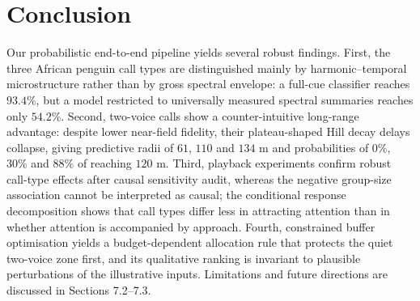 \documentclass{apmcmthesis}
\begin{document}
\section{Conclusion}

Our probabilistic end-to-end pipeline yields several robust findings. First, the three African penguin call types are distinguished mainly by harmonic--temporal microstructure rather than by gross spectral envelope: a full-cue classifier reaches $93.4\%$, but a model restricted to universally measured spectral summaries reaches only $54.2\%$. Second, two-voice calls show a counter-intuitive long-range advantage: despite lower near-field fidelity, their plateau-shaped Hill decay delays collapse, giving predictive radii of $61$, $110$ and $134$ m and probabilities of $0\%$, $30\%$ and $88\%$ of reaching $120$ m. Third, playback experiments confirm robust call-type effects after causal sensitivity audit, whereas the negative group-size association cannot be interpreted as causal; the conditional response decomposition shows that call types differ less in attracting attention than in whether attention is accompanied by approach. Fourth, constrained buffer optimisation yields a budget-dependent allocation rule that protects the quiet two-voice zone first, and its qualitative ranking is invariant to plausible perturbations of the illustrative inputs. Limitations and future directions are discussed in Sections 7.2--7.3.
\end{document}
